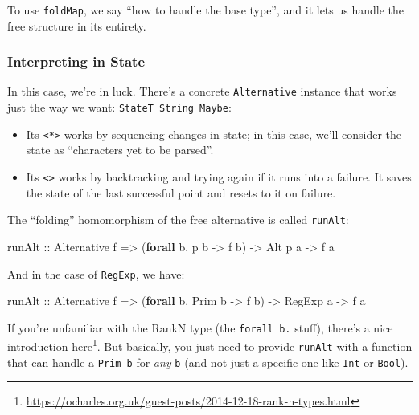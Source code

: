 \documentclass[]{article}
\newenvironment{Shaded}{}{}
\newcommand{\DataTypeTok}[1]{\textcolor[rgb]{0.56,0.13,0.00}{#1}}
\newcommand{\FunctionTok}[1]{\textcolor[rgb]{0.02,0.16,0.49}{#1}}
\newcommand{\KeywordTok}[1]{\textcolor[rgb]{0.00,0.44,0.13}{\textbf{#1}}}
\newcommand{\NormalTok}[1]{#1}
\newcommand{\OtherTok}[1]{\textcolor[rgb]{0.00,0.44,0.13}{#1}}
\renewcommand{\href}[2]{#2\footnote{\url{#1}}}
\begin{document}
To use \texttt{foldMap}, we say ``how to handle the base type'', and it lets us
handle the free structure in its entirety.

\hypertarget{interpreting-in-state}{%
\subsubsection{Interpreting in State}\label{interpreting-in-state}}

In this case, we're in luck. There's a concrete \texttt{Alternative} instance
that works just the way we want: \texttt{StateT\ String\ Maybe}:

\begin{itemize}
\tightlist
\item
  Its \texttt{\textless{}*\textgreater{}} works by sequencing changes in state;
  in this case, we'll consider the state as ``characters yet to be parsed''.
\item
  Its \texttt{\textless{}\textbar{}\textgreater{}} works by backtracking and
  trying again if it runs into a failure. It saves the state of the last
  successful point and resets to it on failure.
\end{itemize}

The ``folding'' homomorphism of the free alternative is called \texttt{runAlt}:

\begin{Shaded}
\begin{Highlighting}[]
\OtherTok{runAlt ::} \DataTypeTok{Alternative}\NormalTok{ f}
       \OtherTok{=>}\NormalTok{ (}\KeywordTok{forall}\NormalTok{ b}\FunctionTok{.}\NormalTok{ p b }\OtherTok{->}\NormalTok{ f b)}
       \OtherTok{->} \DataTypeTok{Alt}\NormalTok{ p a}
       \OtherTok{->}\NormalTok{ f a}
\end{Highlighting}
\end{Shaded}

And in the case of \texttt{RegExp}, we have:

\begin{Shaded}
\begin{Highlighting}[]
\OtherTok{runAlt ::} \DataTypeTok{Alternative}\NormalTok{ f}
       \OtherTok{=>}\NormalTok{ (}\KeywordTok{forall}\NormalTok{ b}\FunctionTok{.} \DataTypeTok{Prim}\NormalTok{ b }\OtherTok{->}\NormalTok{ f b)}
       \OtherTok{->} \DataTypeTok{RegExp}\NormalTok{ a}
       \OtherTok{->}\NormalTok{ f a}
\end{Highlighting}
\end{Shaded}

If you're unfamiliar with the RankN type (the \texttt{forall\ b.} stuff),
there's a
\href{https://ocharles.org.uk/guest-posts/2014-12-18-rank-n-types.html}{nice
introduction here}. But basically, you just need to provide \texttt{runAlt} with
a function that can handle a \texttt{Prim\ b} for \emph{any} \texttt{b} (and not
just a specific one like \texttt{Int} or \texttt{Bool}).
\end{document}
